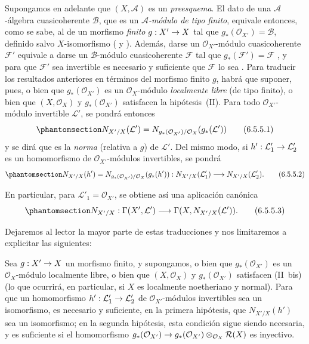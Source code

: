 \documentclass[oneside,10pt]{amsart}
\makeatletter
\newcommand{\ega@arrow}[2]{\mathchoice{#1}{#2}{#2}{#2}}
\renewcommand{\to}{\ega@arrow{\longrightarrow}{\rightarrow}}
\let\EGAOriginalLabel\label
\renewcommand{\label}[1]{\phantomsection\EGAOriginalLabel{#1}}
\makeatother
\begin{document}

\begin{env}[6.5.5]
\label{II.6.5.5-fr}
Supongamos en adelante que $(X,\mathcal{A})$ es un \emph{preesquema}.
El dato de una $\mathcal{A}$-álgebra cuasicoherente $\mathcal{B}$, que es un \emph{$\mathcal{A}$-módulo de tipo finito}, equivale entonces, como se sabe, al de un morfismo \emph{finito} $g:X'\to X$ tal que $g_*(\mathcal{O}_{X'})=\mathcal{B}$, definido salvo $X$-isomorfismo ( y ).
Además, darse un $\mathcal{O}_{X'}$-módulo cuasicoherente $\mathcal{F}'$ equivale a darse un $\mathcal{B}$-módulo cuasicoherente $\mathcal{F}$ tal que $g_*(\mathcal{F}')=\mathcal{F}$ , y para que $\mathcal{F}'$ sea invertible es necesario y suficiente que $\mathcal{F}$ lo sea .
Para traducir los resultados anteriores en términos del morfismo finito $g$, habrá que suponer, pues, o bien que $g_*(\mathcal{O}_{X'})$ es un $\mathcal{O}_X$-módulo \emph{localmente libre} (de tipo finito), o bien que $(X,\mathcal{O}_X)$ y $g_*(\mathcal{O}_{X'})$ satisfacen la hipótesis~(II).
Para todo $\mathcal{O}_{X'}$-módulo invertible $\mathcal{L}'$, se pondrá entonces
\[
\label{II.6.5.5.1-fr}
N_{X'/X}(\mathcal{L}')
=N_{g_*(\mathcal{O}_{X'})/\mathcal{O}_X}(g_*(\mathcal{L}'))
\tag{6.5.5.1}
\]
y se dirá que es la \emph{norma} (relativa a $g$) de $\mathcal{L}'$.
Del mismo modo, si $h':\mathcal{L}'_1\to\mathcal{L}'_2$ es un homomorfismo de $\mathcal{O}_{X'}$-módulos invertibles, se pondrá
\[
\label{II.6.5.5.2-fr}
N_{X'/X}(h')
=N_{g_*(\mathcal{O}_{X'})/\mathcal{O}_X}(g_*(h')):
N_{X'/X}(\mathcal{L}'_1)\to N_{X'/X}(\mathcal{L}'_2).
\tag{6.5.5.2}
\]

En particular, para $\mathcal{L}'_1=\mathcal{O}_{X'}$, se obtiene así una aplicación canónica
\[
\label{II.6.5.5.3-fr}
N_{X'/X}:\Gamma(X',\mathcal{L}')
\to\Gamma(X,N_{X'/X}(\mathcal{L}')).
\tag{6.5.5.3}
\]

Dejaremos al lector la mayor parte de estas traducciones y nos limitaremos a explicitar las siguientes:
\end{env}


\begin{proposition}[6.5.6]
\label{II.6.5.6-fr}
Sea $g:X'\to X$ un morfismo finito, y supongamos, o bien que $g_*(\mathcal{O}_{X'})$ es un $\mathcal{O}_X$-módulo localmente libre, o bien que $(X,\mathcal{O}_X)$ y $g_*(\mathcal{O}_{X'})$ satisfacen \textup{(II~bis)} (lo que ocurrirá, en particular, si $X$ es localmente noetheriano y normal).
Para que un homomorfismo $h':\mathcal{L}'_1\to\mathcal{L}'_2$ de $\mathcal{O}_{X'}$-módulos invertibles sea un isomorfismo, es necesario y suficiente, en la primera hipótesis, que $N_{X'/X}(h')$ sea un isomorfismo;
en la segunda hipótesis, esta condición sigue siendo necesaria, y es suficiente si el homomorfismo
$g_*(\mathcal{O}_{X'})\to
g_*(\mathcal{O}_{X'})\otimes_{\mathcal{O}_X}\mathcal{R}(X)$
es inyectivo.
\end{proposition}
\end{document}
